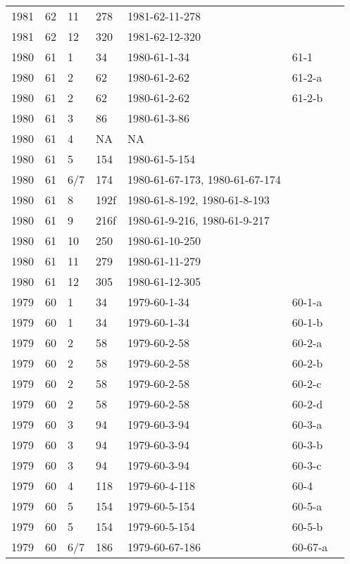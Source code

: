 \begin{longtable}{ |l|l|l|l|p{2.7cm}|l|p{2cm}| }
 1981 & 62 &    11 &     278 & 1981-62-11-278 &  & \\
 1981 & 62 &    12 &     320 & 1981-62-12-320 &  & \\
 1980 & 61 &     1 &      34 &   1980-61-1-34 & 61-1 & \\
 1980 & 61 &     2 &      62 &   1980-61-2-62 & 61-2-a & \\
 1980 & 61 &     2 &      62 &   1980-61-2-62 & 61-2-b & \\
 1980 & 61 &     3 &      86 &   1980-61-3-86 &  & \\
 1980 & 61 &     4 &      NA &    NA          &  & \\
 1980 & 61 &     5 &     154 & 1980-61-5-154  &  & \\
 1980 & 61 &   6/7 &     174 & 1980-61-67-173, 1980-61-67-174 &  & \\
 1980 & 61 &     8 &    192f & 1980-61-8-192, 1980-61-8-193 &  & \\
 1980 & 61 &     9 &    216f & 1980-61-9-216, 1980-61-9-217 &  & \\
 1980 & 61 &    10 &     250 & 1980-61-10-250 &  & \\
 1980 & 61 &    11 &     279 & 1980-61-11-279 &  & \\
 1980 & 61 &    12 &     305 & 1980-61-12-305 &  & \\
 1979 & 60 &     1 &      34 & 1979-60-1-34   & 60-1-a & \\
 1979 & 60 &     1 &      34 & 1979-60-1-34   & 60-1-b & \\
 1979 & 60 &     2 &      58 & 1979-60-2-58   & 60-2-a & \\
 1979 & 60 &     2 &      58 & 1979-60-2-58   & 60-2-b & \\
 1979 & 60 &     2 &      58 & 1979-60-2-58   & 60-2-c & \\
 1979 & 60 &     2 &      58 & 1979-60-2-58   & 60-2-d & \\
 1979 & 60 &     3 &      94 & 1979-60-3-94   & 60-3-a & \\
 1979 & 60 &     3 &      94 & 1979-60-3-94   & 60-3-b & \\
 1979 & 60 &     3 &      94 & 1979-60-3-94   & 60-3-c & \\
 1979 & 60 &     4 &     118 & 1979-60-4-118  & 60-4 & \\
 1979 & 60 &     5 &     154 & 1979-60-5-154  & 60-5-a & \\
 1979 & 60 &     5 &     154 & 1979-60-5-154  & 60-5-b & \\
 1979 & 60 &   6/7 &     186 & 1979-60-67-186 & 60-67-a & \\

\end{longtable}
